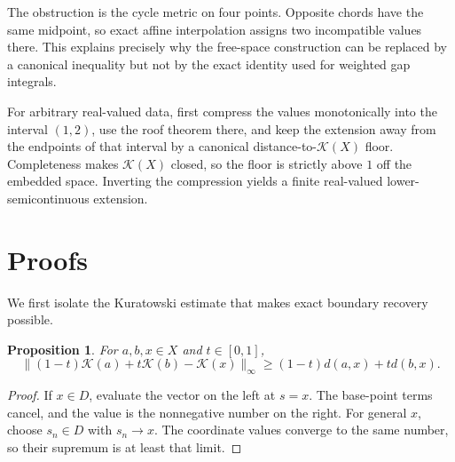 \documentclass[11pt]{article}
\newtheorem{proposition}[theorem]{Proposition}
\newcommand{\K}{\mathcal K}
\begin{document}
The obstruction is the cycle metric on four points.  Opposite chords have the
same midpoint, so exact affine interpolation assigns two incompatible values
there.  This explains precisely why the free-space construction can be
replaced by a canonical inequality but not by the exact identity used for
weighted gap integrals.

For arbitrary real-valued data, first compress the values monotonically into
the interval $(1,2)$, use the roof theorem there, and keep the extension away
from the endpoints of that interval by a canonical distance-to-$\K(X)$ floor.
Completeness makes $\K(X)$ closed, so the floor is strictly above $1$ off the
embedded space.  Inverting the compression yields a finite real-valued
lower-semicontinuous extension.

\section{Proofs}

We first isolate the Kuratowski estimate that makes exact boundary recovery
possible.

\begin{proposition}\label{prop:exposure}
For $a,b,x\in X$ and $t\in[0,1]$,
\begin{equation}\label{eq:exposure}
\bigl\|(1-t)\K(a)+t\K(b)-\K(x)\bigr\|_\infty
\ge (1-t)d(a,x)+t d(b,x).
\end{equation}
\end{proposition}

\begin{proof}
If $x\in D$, evaluate the vector on the left at $s=x$.  The base-point terms
cancel, and the value is the nonnegative number on the right.  For general
$x$, choose $s_n\in D$ with $s_n\to x$.  The coordinate values converge to
the same number, so their supremum is at least that limit.
\end{proof}
\end{document}
